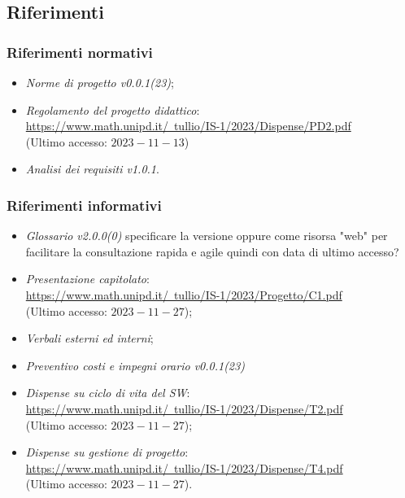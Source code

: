 \documentclass[10pt, a4paper]{article}
\begin{document}
\subsection{Riferimenti}

\subsubsection{Riferimenti normativi} 
\begin{itemize}
\item \textit{Norme di progetto v0.0.1(23)};
\item \textit{Regolamento del progetto didattico}: \\
\href{https://www.math.unipd.it/~tullio/IS-1/2023/Dispense/PD2.pdf}{https://www.math.unipd.it/~tullio/IS-1/2023/Dispense/PD2.pdf}\\
(Ultimo accesso: $2023-11-13$)

\item \textit{Analisi dei requisiti v1.0.1}.
\end{itemize}

\subsubsection{Riferimenti informativi}
\begin{itemize}
    \item \textit{Glossario v2.0.0(0)} specificare la versione oppure come risorsa "web" per facilitare la consultazione rapida e agile quindi con data di ultimo accesso?
   
    \item \textit{Presentazione capitolato}:\\
    \href{https://www.math.unipd.it/~tullio/IS-1/2023/Progetto/C1.pdf}{https://www.math.unipd.it/~tullio/IS-1/2023/Progetto/C1.pdf}\\
    (Ultimo accesso: $2023-11-27$);   
    
    \item \textit{Verbali esterni ed interni};
    \item \textit{Preventivo costi e impegni orario v0.0.1(23)}
    
    \item \textit{Dispense su ciclo di vita del SW}:\\
    \href{https://www.math.unipd.it/~tullio/IS-1/2023/Dispense/T2.pdf}{https://www.math.unipd.it/~tullio/IS-1/2023/Dispense/T2.pdf}\\
    (Ultimo accesso: $2023-11-27$);
    
    \item  \textit{Dispense su gestione di progetto}:\\
    \href{https://www.math.unipd.it/~tullio/IS-1/2023/Dispense/T4.pdf}{https://www.math.unipd.it/~tullio/IS-1/2023/Dispense/T4.pdf}\\
    (Ultimo accesso: $2023-11-27$).
\end{itemize}
\end{document}
